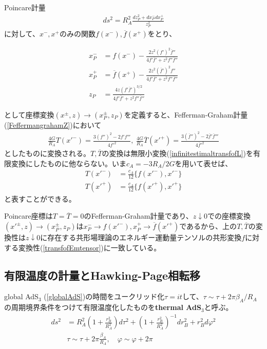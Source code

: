 Poincare計量
\begin{align}
ds^2=R_A^2\frac{dz_P^2+dx_P^-dx_P^+}{z_P^2}
\end{align}
に対して、$x^-,x^+$のみの関数$f(x^-),\overline{f}(x^+)$をとり、
\begin{oframed}
\begin{align}
x_P^-&=f(x^-)-\frac{2z^2(f')^2\overline{f}''}{4f'\overline{f}'+z^2f''\overline{f}''}\label{robertsmap1}\\
x_P^+&=\overline{f}(x^+)-\frac{2z^2(\overline{f}')^2f''}{4f'\overline{f}'+z^2f''\overline{f}''}\label{robertsmap2}\\
z_P&=\frac{4z(f'\overline{f}')^{3/2}}{4f'\overline{f}'+z^2f''\overline{f}''}\label{robertsmapz}
\end{align}
\end{oframed}
として座標変換$(x^\pm,z)\to (x_P^\pm,z_P)$を定義すると、Fefferman-Graham計量(\ref{FeffermangrahamZ})において
\begin{align}
\frac{4G}{R_A} T(x'^-)=\frac{3(f'')^2-2f'f'''}{4f'^2},\ \frac{4G}{R_A} \overline{T}(x'^+)=\frac{3(\overline{f}'')^2-2\overline{f}'\overline{f}'''}{4\overline{f}'^2}
\end{align}
としたものに変換される。$T,\overline{T}$の変換は無限小変換(\ref{infinitestimaltransfofL})を有限変換にしたものに他ならない。いま$c_A=-3R_A/2G$を用いて表せば、
\begin{align}
T(x'^-)&=\frac{c_A}{12}\{f(x'^-),x'^-\}\\
T(x'^+)&=\frac{c_A}{12}\{f(x'^+),x'^+\}
\end{align}
と表すことができる。

Poincare座標は$T=\overline{T}=0$のFefferman-Graham計量であり、$z\downarrow 0$での座標変換$(x'^\pm,z)\to (x_P^\pm,z_P)$は$x_P^-\to f(x'^-),x_P^+\to \overline{f}(x'^+)$であるから、上の$T,\overline{T}$の変換性は$z\downarrow 0$に存在する共形場理論のエネルギー運動量テンソルの共形変換$f$に対する変換性(\ref{transfofEmtensor})に一致している。

\subsection{有限温度の計量とHawking-Page相転移}
global AdS$_3$ (\ref{globalAdS})の時間をユークリッド化$\tau=it$して、$\tau\sim \tau+2\pi \beta_A/R_A$の周期境界条件をつけて有限温度化したものを\textbf{thermal AdS$_3$}と呼ぶ。
\begin{align}\label{tads}
ds^2&=R_A^2\left(1+\frac{r_{B}^2}{R_A^2}\right)d\tau^2+\left(1+\frac{r_{B}^2}{R_A^2}\right)^{-1}dr_{B}^2+r_{B}^2d\varphi^2\\
&\tau\sim \tau+2\pi\frac{\beta_A}{R_A},\quad \varphi\sim \varphi+2\pi
\end{align}

